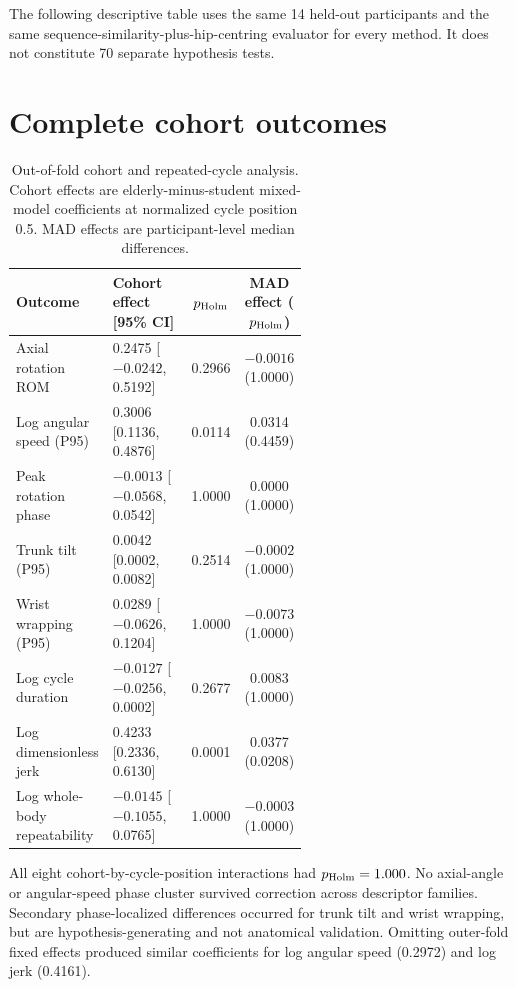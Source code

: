 \documentclass[pdflatex,sn-mathphys-num]{sn-jnl}
\begin{document}
The following descriptive table uses the same 14 held-out participants and the
same sequence-similarity-plus-hip-centring evaluator for every method. It does
not constitute 70 separate hypothesis tests.

\begingroup
\scriptsize
\setlength{\tabcolsep}{2pt}

\endgroup

\section{Complete cohort outcomes}

\begin{table}[h]
\caption{Out-of-fold cohort and repeated-cycle analysis. Cohort effects are
elderly-minus-student mixed-model coefficients at normalized cycle position
0.5. MAD effects are participant-level median differences.}
\label{tab:cohort}
\centering
\scriptsize
\setlength{\tabcolsep}{3pt}
\begin{tabular}{p{0.28\linewidth}p{0.30\linewidth}cc}
\toprule
Outcome & Cohort effect [95\% CI] & $p_{\rm Holm}$ &
MAD effect ($p_{\rm Holm}$)\\
\midrule
Axial rotation ROM & 0.2475 [$-0.0242$, 0.5192] & 0.2966 & $-0.0016$ (1.0000)\\
Log angular speed (P95) & 0.3006 [0.1136, 0.4876] & 0.0114 & 0.0314 (0.4459)\\
Peak rotation phase & $-0.0013$ [$-0.0568$, 0.0542] & 1.0000 & 0.0000 (1.0000)\\
Trunk tilt (P95) & 0.0042 [0.0002, 0.0082] & 0.2514 & $-0.0002$ (1.0000)\\
Wrist wrapping (P95) & 0.0289 [$-0.0626$, 0.1204] & 1.0000 & $-0.0073$ (1.0000)\\
Log cycle duration & $-0.0127$ [$-0.0256$, 0.0002] & 0.2677 & 0.0083 (1.0000)\\
Log dimensionless jerk & 0.4233 [0.2336, 0.6130] & 0.0001 & 0.0377 (0.0208)\\
Log whole-body repeatability & $-0.0145$ [$-0.1055$, 0.0765] & 1.0000 & $-0.0003$ (1.0000)\\
\bottomrule
\end{tabular}
\end{table}

All eight cohort-by-cycle-position interactions had
$p_{\rm Holm}=1.000$. No axial-angle or angular-speed phase cluster survived
correction across descriptor families. Secondary phase-localized differences
occurred for trunk tilt and wrist wrapping, but are hypothesis-generating and
not anatomical validation. Omitting outer-fold fixed effects produced similar
coefficients for log angular speed (0.2972) and log jerk (0.4161).
\end{document}
